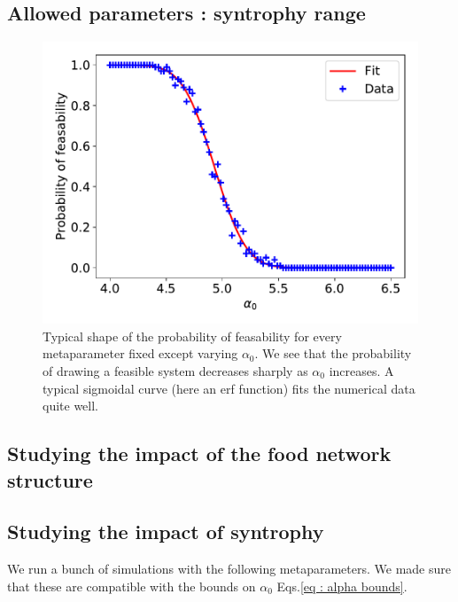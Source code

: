 \documentclass[12pt, titlepage]{report}
\begin{document}
\subsection{Allowed parameters : syntrophy range}
\begin{figure}[h!]
\centering
\includegraphics[scale=0.7]{figures/alpha0_probability_of_feasability}
\caption{Typical shape of the probability of feasability for every metaparameter fixed except varying $\alpha_0$. We see that the probability of drawing a feasible system decreases sharply as $\alpha_0$ increases. A typical sigmoidal curve (here an erf function) fits the numerical data quite well.}
\end{figure}

\subsection{Studying the impact of the food network structure}
\subsection{Studying the impact of syntrophy}
We run a bunch of simulations with the following metaparameters. We made sure that these are compatible with the bounds on $\alpha_0$ Eqs.\eqref{eq : alpha bounds}.
\end{document}
